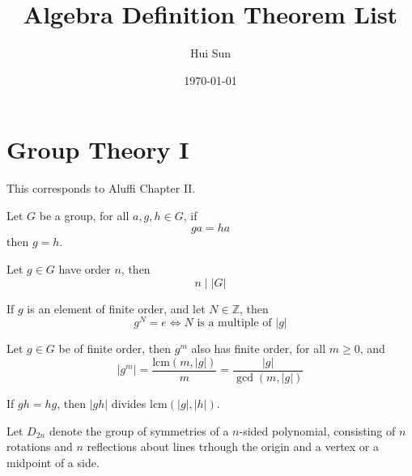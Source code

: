 \documentclass[openany]{book}
\title{Algebra Definition Theorem List}
\date{\today}
\author{Hui Sun}
\begin{document}
\maketitle

\tableofcontents
\newpage

\chapter{Group Theory I}
This corresponds to Aluffi Chapter II.

\begin{prop}
    Let $G$ be a group, for all $a,g,h\in G$, if 
    \begin{equation*}
        ga=ha
    \end{equation*}
    then $g=h$.
\end{prop}

\begin{prop}
    Let $g\in G$ have order $n$, then 
    \begin{equation*}
        n\mid |G|
    \end{equation*}
\end{prop}

\begin{cor}
    If $g$ is an element of finite order, and let $N\in\mathbb{Z}$, then 
    \begin{equation*}
        g^N=e \iff N \text{ is a multiple of }|g|
    \end{equation*}
\end{cor}

\begin{prop}
    Let $g\in G$ be of finite order, then $g^m$ also has finite order, for all $m\geq 0$, and 
    \begin{equation*}
        \left|g^m\right|=\frac{\text{lcm}(m,|g|)}{m}=\frac{|g|}{\gcd(m,|g|)}
    \end{equation*}
\end{prop}

\begin{prop}
    If $gh=hg$, then $|gh|$ divides $\text{lcm}(|g|,|h|)$.
\end{prop}


\begin{defn}
    Let $D_{2n}$ denote the group of symmetries of a $n$-sided polynomial, consisting of $n$ rotations and $n$ reflections about lines trhough the origin and a vertex or a midpoint of a side.
\end{defn}
\end{document}

